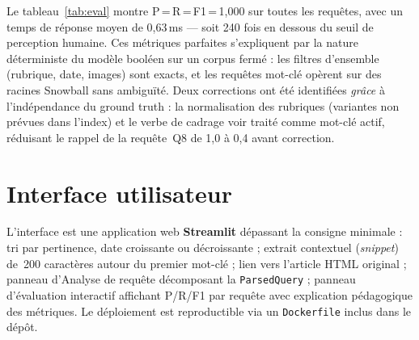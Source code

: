 Le tableau~\ref{tab:eval} montre P\,=\,R\,=\,F1\,=\,1,000 sur toutes les requêtes,
avec un temps de réponse moyen de 0,63\,ms — soit 240 fois en dessous du seuil de
perception humaine. Ces métriques parfaites s'expliquent par la nature déterministe du
modèle booléen sur un corpus fermé : les filtres d'ensemble (rubrique, date, images)
sont exacts, et les requêtes mot-clé opèrent sur des racines Snowball sans ambiguïté.
Deux corrections ont été identifiées \emph{grâce} à l'indépendance du ground truth :
la normalisation des rubriques (variantes non prévues dans l'index) et le verbe de cadrage
\og{}voir\fg{} traité comme mot-clé actif, réduisant le rappel de la requête~Q8 de 1,0
à 0,4 avant correction.

\section{Interface utilisateur}

L'interface est une application web \textbf{Streamlit} dépassant la consigne minimale :
tri par pertinence, date croissante ou décroissante ; extrait contextuel (\emph{snippet})
de~200 caractères autour du premier mot-clé ; lien vers l'article HTML original ; panneau
d'\og{}Analyse de requête\fg{} décomposant la \texttt{ParsedQuery} ; panneau d'évaluation
interactif affichant P/R/F1 par requête avec explication pédagogique des métriques.
Le déploiement est reproductible via un \texttt{Dockerfile} inclus dans le dépôt.
